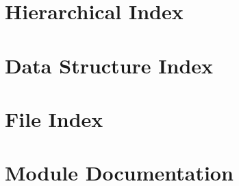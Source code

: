 \let\mypdfximage\pdfximage\def\pdfximage{\immediate\mypdfximage}\documentclass[twoside]{book}
\newcommand{\+}{\discretionary{\mbox{\scriptsize$\hookleftarrow$}}{}{}}
\begin{document}
\chapter{Hierarchical Index}

\chapter{Data Structure Index}

\chapter{File Index}

\chapter{Module Documentation}





























\end{document}
